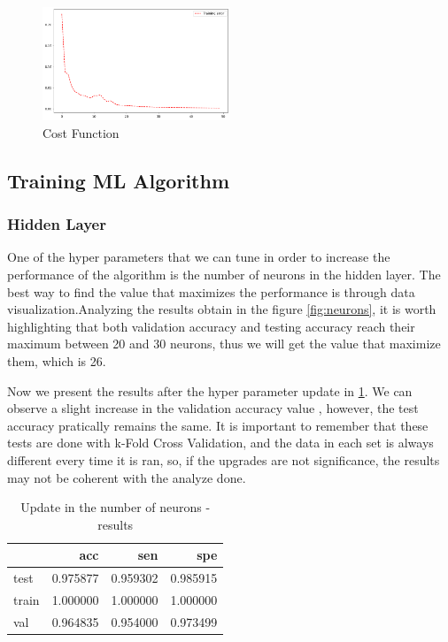 \documentclass[12pt,a4paper,twocolumn]{article}
\begin{document}
\begin{figure}[H]

\includegraphics[width=0.5\textwidth]{images/cost_func.png}
\centering
\caption{\label{fig:cost_func} Cost Function}
\end{figure}


\subsection{Training ML Algorithm}
\subsubsection{Hidden Layer}
\par One of the hyper parameters that we can tune in order to increase the performance of the algorithm  is the number of neurons in the hidden layer. The best way to find the value that maximizes the performance  is through data visualization.Analyzing the results obtain in the figure \ref{fig:neurons}, it is worth highlighting that both validation accuracy and testing accuracy reach their maximum between 20 and 30 neurons, thus we will get the value that maximize them, which is 26.
\par Now we present the results after the hyper parameter update in \ref{tab:results_2}. We can observe a slight increase in the validation accuracy value , however, the test accuracy pratically remains the same. 
It is important to remember that these tests are done with k-Fold Cross Validation, and the data in each set is always different every time it is ran, so, if the upgrades are not significance, the results may not be coherent with the analyze done.  

\begin{table}[h!]
\begin{tabular}{lrrr}
\toprule
{} &       acc &       sen &       spe \\
\midrule
test  &  0.975877 &  0.959302 &  0.985915 \\
train &  1.000000 &  1.000000 &  1.000000 \\
val   &  0.964835 &  0.954000 &  0.973499 \\
\bottomrule
\end{tabular}

    \caption{Update in the number of neurons - results }
    \label{tab:results_2}
\end{table}
\end{document}
